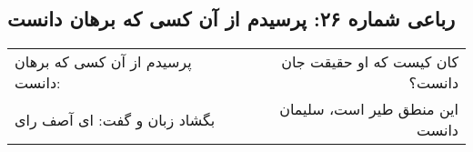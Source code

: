 \begin{center}
\section*{رباعی شماره ۲۶: پرسیدم از آن کسی که برهان دانست}
\label{sec:026}
\begin{longtable}{l p{0.5cm} r}
پرسیدم از آن کسی که برهان دانست:
&&
کان کیست که او حقیقت جان دانست؟
\\
بگشاد زبان و گفت: ای آصف رای
&&
این منطق طیر است، سلیمان دانست
\\
\end{longtable}
\end{center}
